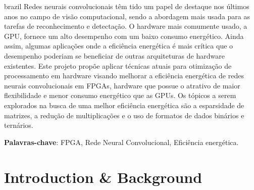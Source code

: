 \documentclass[
    12pt,                       %
    oneside,                    %
    a4paper,                    %
    brazil,                     %
    french,                     %
    spanish,                    %
    english,                    %
    ]{abntex2}
\begin{document}
\setlength{\absparsep}{18pt} %
\begin{resumo}[Resumo]
  \begin{otherlanguage*}{brazil}
    Redes neurais convolucionais têm tido um papel de destaque nos últimos anos no campo de visão computacional, sendo a abordagem mais usada para as tarefas de reconhecimento e detectação.
    O hardware mais comumente usado, a GPU, fornece um alto desempenho com um baixo consumo energético. Ainda assim, algumas aplicações onde a eficiência energética é mais crítica que o desempenho poderiam se beneficiar de outras arquiteturas de hardware existentes.
    Este projeto propõe aplicar técnicas atuais para otimização de processamento em hardware visando melhorar a eficiência energética de redes neurais convolucionais em FPGAs, hardware que possue o atrativo de maior flexibilidade e menor consumo energético que as GPUs.
    Os tópicos a serem explorados na busca de uma melhor eficiência energética são a esparsidade de matrizes, a redução de multiplicações e o uso de formatos de dados binários e ternários.

 \textbf{Palavras-chave}: FPGA, Rede Neural Convolucional, Eficiência energética.
  \end{otherlanguage*}
\end{resumo}

\tableofcontents*
\cleardoublepage


\textual


\chapter[Introduction \& Background]{Introduction \& Background}
\end{document}

